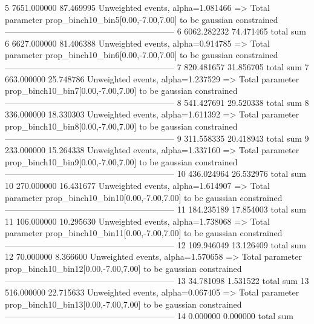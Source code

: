 5          7651.000000     87.469995       Unweighted events, alpha=1.081466
  => Total parameter prop_binch10_bin5[0.00,-7.00,7.00] to be gaussian constrained
------------------------------------------------------------
6          6062.282232     74.471465       total sum                     
6          6627.000000     81.406388       Unweighted events, alpha=0.914785
  => Total parameter prop_binch10_bin6[0.00,-7.00,7.00] to be gaussian constrained
------------------------------------------------------------
7          820.481657      31.856705       total sum                     
7          663.000000      25.748786       Unweighted events, alpha=1.237529
  => Total parameter prop_binch10_bin7[0.00,-7.00,7.00] to be gaussian constrained
------------------------------------------------------------
8          541.427691      29.520338       total sum                     
8          336.000000      18.330303       Unweighted events, alpha=1.611392
  => Total parameter prop_binch10_bin8[0.00,-7.00,7.00] to be gaussian constrained
------------------------------------------------------------
9          311.558335      20.418943       total sum                     
9          233.000000      15.264338       Unweighted events, alpha=1.337160
  => Total parameter prop_binch10_bin9[0.00,-7.00,7.00] to be gaussian constrained
------------------------------------------------------------
10         436.024964      26.532976       total sum                     
10         270.000000      16.431677       Unweighted events, alpha=1.614907
  => Total parameter prop_binch10_bin10[0.00,-7.00,7.00] to be gaussian constrained
------------------------------------------------------------
11         184.235189      17.854003       total sum                     
11         106.000000      10.295630       Unweighted events, alpha=1.738068
  => Total parameter prop_binch10_bin11[0.00,-7.00,7.00] to be gaussian constrained
------------------------------------------------------------
12         109.946049      13.126409       total sum                     
12         70.000000       8.366600        Unweighted events, alpha=1.570658
  => Total parameter prop_binch10_bin12[0.00,-7.00,7.00] to be gaussian constrained
------------------------------------------------------------
13         34.781098       1.531522        total sum                     
13         516.000000      22.715633       Unweighted events, alpha=0.067405
  => Total parameter prop_binch10_bin13[0.00,-7.00,7.00] to be gaussian constrained
------------------------------------------------------------
14         0.000000        0.000000        total sum                     
